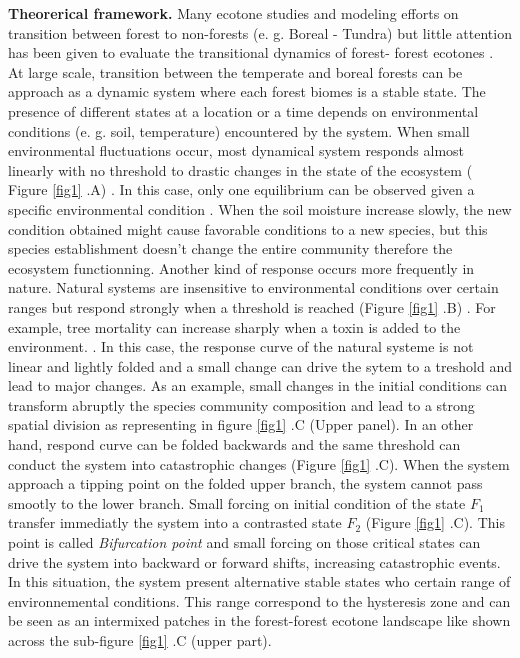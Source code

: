 \textbf{Theorerical framework.}  Many ecotone studies and modeling efforts on
transition between forest to non-forests (e. g. Boreal - Tundra)
\cite{Scheffer2012,Scheffer2001,Hirota2011} but little attention has been
given to evaluate the transitional dynamics of forest- forest ecotones
\cite{Goldblum2010,Graignic2013}. At large scale, transition between  the
temperate and boreal forests can be approach as a dynamic system where each
forest biomes is a stable state. The presence of different states at a
location or a time depends on environmental conditions (e. g. soil,
temperature) encountered by the system. When small environmental fluctuations
occur, most dynamical system responds almost linearly with no threshold to
drastic changes in the state of the ecosystem ( Figure \ref{fig1} .A)
\cite{Scheffer2001,Scheffer2009}. In this case, only one equilibrium can be
observed given a specific environmental condition
\cite{Scheffer2001,Scheffer2009,scheffer2009critical}.  When the soil moisture
increase slowly, the new condition obtained might cause favorable conditions
to a new species, but this species establishment doesn't change the entire
community therefore the ecosystem functionning. Another kind of response
occurs more frequently in nature.  Natural systems are insensitive to
environmental conditions over certain ranges but respond strongly when a
threshold is reached (Figure \ref{fig1} .B) \cite{scheffer2009critical}. For
example, tree mortality can increase sharply when a toxin is added to the
environment. \cite{scheffer2009critical}. In this case, the response curve of
the natural systeme is not linear and lightly folded and a small change can
drive the sytem to a treshold and lead to major changes. As an example, small
changes in the initial conditions can transform abruptly the species community
composition and lead to a strong spatial division as representing in figure
\ref{fig1} .C (Upper panel). In an other hand, respond curve can be folded
backwards and the same threshold can conduct the system into catastrophic
changes (Figure \ref{fig1} .C).  When the system approach a tipping point on
the folded upper branch, the system cannot pass smootly to the lower branch.
Small forcing on initial condition of the state $F_1$ transfer immediatly the
system into a contrasted state $F_2$ (Figure \ref{fig1} .C). This point is
called \textit{Bifurcation point} and small forcing on those critical states
can drive the system into backward or forward shifts, increasing catastrophic
events. In this situation, the system present alternative stable states who
certain range of environnemental conditions. This range correspond to the
hysteresis zone and can be seen as an intermixed patches in the forest-forest
ecotone landscape like shown across the sub-figure \ref{fig1} .C (upper part).
\\


